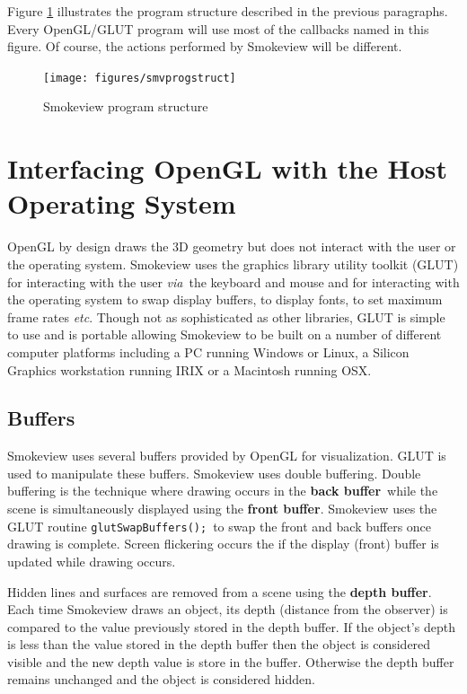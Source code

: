 \documentclass[11pt,twoside]{book}
\begin{document}
Figure \ref{figprogstruct} illustrates the program structure
described in the previous paragraphs.  Every OpenGL/GLUT program
will use most of the callbacks named in this figure.  Of course,
the actions performed by Smokeview will be different.

\begin{figure}
\begin{center}
\texttt{[image: figures/smvprogstruct]}
\end{center}
\caption{Smokeview program structure}
\label{figprogstruct}
\end{figure}

%
%

\chapter{Interfacing OpenGL with the Host Operating System}
\label{openglinterface}
OpenGL by design draws the 3D geometry but
does not interact with the user or the operating system. Smokeview
uses the graphics library utility toolkit (GLUT) for interacting
with the user {\em via}\ the keyboard and mouse and for
interacting with the operating system to swap display buffers, to
display fonts, to set maximum frame rates {\em etc}. Though not as
sophisticated as other libraries, GLUT is simple to use and is
portable allowing Smokeview to be built on a number of different
computer platforms including a PC running Windows or Linux, a
Silicon Graphics workstation running IRIX or a Macintosh running
OSX.

%
%

\section{Buffers} Smokeview uses several buffers provided by
OpenGL for visualization.  GLUT is used to manipulate these
buffers. Smokeview uses double buffering.  Double buffering is the
technique where drawing occurs in the {\bf back buffer}\ while the
scene is simultaneously displayed using the {\bf front buffer}.
Smokeview uses the GLUT routine {\tt glutSwapBuffers();}\ to swap
the front and back buffers once drawing is complete. Screen
flickering occurs the if the display (front) buffer is updated
while drawing occurs.

Hidden lines and surfaces are removed from a scene using the {\bf
depth buffer}.  Each time Smokeview draws an object, its depth
(distance from the observer) is compared to the value previously
stored in the depth buffer.  If the object's depth is less than
the value stored in the depth buffer then the object is considered
visible and the new depth value is store in the buffer. Otherwise
the depth buffer remains unchanged and the object is considered
hidden.
\end{document}
